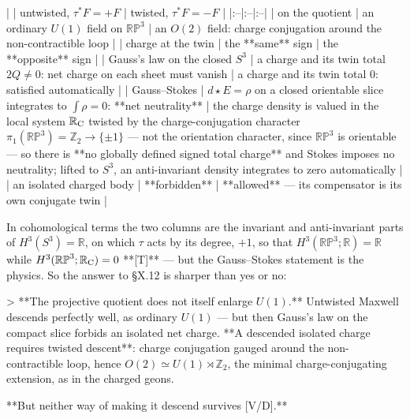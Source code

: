 | | untwisted, $\tau^*F = +F$ | twisted, $\tau^*F = -F$ |
|:--|:--|:--|
| on the quotient | an ordinary $U(1)$ field on $\mathbb{RP}^3$ | an $O(2)$ field: charge conjugation around the non-contractible loop |
| charge at the twin | the **same** sign | the **opposite** sign |
| Gauss's law on the closed $S^3$ | a charge and its twin total $2Q\neq0$: net charge on each sheet must vanish | a charge and its twin total $0$: satisfied automatically |
| Gauss–Stokes | $d{\star}E = \rho$ on a closed orientable slice integrates to $\int\rho = 0$: **net neutrality** | the charge density is valued in the local system $\mathbb{R}_{\rm C}$ twisted by the charge-conjugation character $\pi_1(\mathbb{RP}^3) = \mathbb{Z}_2\to\{\pm1\}$ — not the orientation character, since $\mathbb{RP}^3$ is orientable — so there is **no globally defined signed total charge** and Stokes imposes no neutrality; lifted to $S^3$, an anti-invariant density integrates to zero automatically |
| an isolated charged body | **forbidden** | **allowed** — its compensator is its own conjugate twin |

In cohomological terms the two columns are the invariant and anti-invariant parts of $H^3(S^3) = \mathbb{R}$, on which $\tau$ acts by its degree, $+1$, so that $H^3(\mathbb{RP}^3;\mathbb{R}) = \mathbb{R}$ while $H^3(\mathbb{RP}^3;\mathbb{R}_{\rm C}) = 0$ **[T]** — but the Gauss–Stokes statement is the physics. So the answer to §X.12 is sharper than yes or no:

> **The projective quotient does not itself enlarge $U(1)$.** Untwisted Maxwell descends perfectly well, as ordinary $U(1)$ — but then Gauss's law on the compact slice forbids an isolated net charge. **A descended isolated charge requires twisted descent**: charge conjugation gauged around the non-contractible loop, hence $O(2)\simeq U(1)\rtimes\mathbb{Z}_2$, the minimal charge-conjugating extension, as in the charged geons.

**But neither way of making it descend survives [V/D].**

